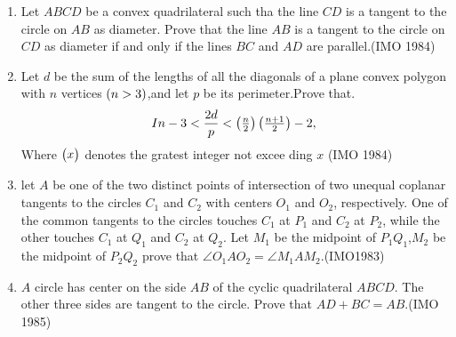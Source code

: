 \begin{enumerate}
\item Let $ABCD$ be a convex quadrilateral such tha the line $CD$ is a  tangent to the circle on $AB$ as diameter. Prove that the line $AB$ is a tangent to the  circle on $CD$ as diameter if and only if the lines $BC$ and $AD$ are parallel.\hfill(IMO 1984)
\item Let $d$ be the sum of the lengths of all the diagonals of a plane convex polygon with $n$ vertices $\left(n>3\right)$,and let $p$ be its perimeter.Prove that.\begin{align*}                                    In-3<\frac{2d}{p}<\begin{pmatrix}\frac{n}{2}\end{pmatrix}\begin{pmatrix}\frac{n+1}{2}\end{pmatrix}-2,\end{align*}
		Where $\begin{pmatrix}x\end{pmatrix}$ denotes the gratest integer not excee    ding $x$  \hfill(IMO 1984)

	
\item let $A$ be one of the two distinct points of intersection of two unequal coplanar tangents to the circles $C_1$ and $C_2$ with centers $ O_1$ and $O_2$, respectively. One of the common tangents to the circles touches $C_1$ at $P_1$ and $C_2$ at $P_2$, while the other touches $C_1$ at $Q_1$ and $C_2$ at $Q_2$.  Let $M_1$ be the midpoint of $P_1Q_1$,$M_2$ be the midpoint of $P_2Q_2$ prove that $\angle O_1AO_2 =\angle M_1AM_2$.\hfill(IMO1983)

     \item $A$ circle has center on the side $AB$ of the cyclic quadrilateral $ABCD$. The other three sides are tangent to the circle. Prove that $AD+BC = AB$.\hfill(IMO 1985)


\end{enumerate}
